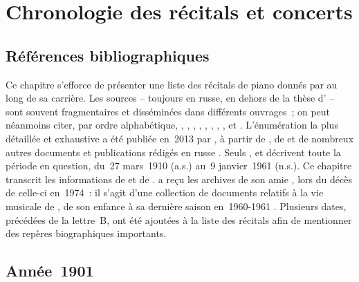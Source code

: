 \chapter[%
Chronologie des récitals et concerts][%
Chronologie des récitals et concerts]{%
Chronologie des récitals et concerts}
\label{chap:Recitals}

\section{Références bibliographiques}

Ce chapitre s'efforce de présenter une liste des récitals de piano donnés
par \VSofronitsky{} au long de sa carrière.
Les sources -- toujours en russe, en dehors de la thèse d'\EWhite{} -- sont
souvent fragmentaires et disséminées dans différents ouvrages~; on peut
néanmoins citer, par ordre alphabétique, \citet[p.~354]{Badeyan08},
\citet[p.~427, p.~435, p.~437, p.~440-452 et p.~455-461]{Milshteyn82a},
\citet{Nekrasova08}, \citet[p.~393-395]{Nikonovich08}, \citet{Panarine},
\citet{Shiryaeva}, \citet{Sofronitsky82a}, \citet[p.~\hbox{40-71}]{White},
\citet[p.~301]{Zhukova82} et \citet[p.~216]{Zhukova08}.
L'énumération la plus détaillée et exhaustive a été publiée en~2013 par
\citet[p.~393-452]{Scriabine}, à partir de \citet{Milshteyn82a}, de
\citet{Nikonovich08} et de nombreux autres documents et publications rédigés
en russe \citep[voir][p.~444-452]{Scriabine}.
Seuls \citeauthor{Nekrasova08}, \citeauthor{Scriabine} et \citeauthor{White}
décrivent toute la période en question, du~27 mars~1910 (a.s.) au~9
janvier~1961 (n.s.).
Ce chapitre transcrit les informations de \citet[p.~393-444]{Scriabine} et
de \citet{Nekrasova08}.
\citeauthor{Nekrasova08} a reçu les archives de son amie \AVizel{}, lors du
décès de celle-ci en~1974~: il s'agit d'une collection de documents relatifs
à la vie musicale de \VSofronitsky{}, de son enfance à sa dernière saison
en~1960-1961 \citep[voir][p.~132-133]{Nekrasova08}.
Plusieurs dates, précédées de la lettre~B, ont été ajoutées à la liste des
récitals afin de mentionner des repères biographiques importants.

\section{Année~1901}

